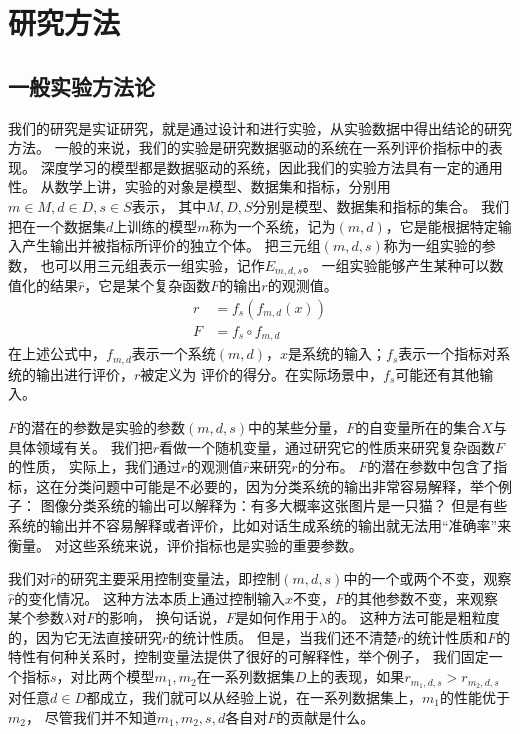 
\chapter{研究方法}\label{ch:研究方法}

\section{一般实验方法论}\label{sec:研究方法论}
我们的研究是实证研究，就是通过设计和进行实验，从实验数据中得出结论的研究方法。
一般的来说，我们的实验是研究数据驱动的系统在一系列评价指标中的表现。
深度学习的模型都是数据驱动的系统，因此我们的实验方法具有一定的通用性。
从数学上讲，实验的对象是模型、数据集和指标，分别用$m\in M, d\in D, s\in S$表示，
其中$M, D, S$分别是模型、数据集和指标的集合。
我们把在一个数据集$d$上训练的模型$m$称为一个系统，记为$(m, d)$，它是能根据特定输入产生输出并被指标所评价的独立个体。
把三元组$(m, d, s)$称为一组实验的参数， 也可以用三元组表示一组实验，记作$E_{m, d, s}$。
一组实验能够产生某种可以数值化的结果$\hat{r}$，它是某个复杂函数$\mathit{F}$的输出$r$的观测值。
\begin{align}
    r &= f_s\left( f_{m, d}(x) \right) \\
    \mathit{F} &= f_s \circ f_{m, d}
\end{align}
在上述公式中，$f_{m, d}$表示一个系统$(m, d)$，$x$是系统的输入；$f_s$表示一个指标对系统的输出进行评价，$r$被定义为
评价的得分。在实际场景中，$f_s$可能还有其他输入。

$\mathit{F}$的潜在的参数是实验的参数$(m, d, s)$中的某些分量，$\mathit{F}$的自变量所在的集合$X$与具体领域有关。
我们把$r$看做一个随机变量，通过研究它的性质来研究复杂函数$\mathit{F}$的性质，
实际上，我们通过$r$的观测值$\hat{r}$来研究$r$的分布。
$\mathit{F}$的潜在参数中包含了指标，这在分类问题中可能是不必要的，因为分类系统的输出非常容易解释，举个例子：
图像分类系统的输出可以解释为：有多大概率这张图片是一只猫？
但是有些系统的输出并不容易解释或者评价，比如对话生成系统的输出就无法用“准确率”来衡量。
对这些系统来说，评价指标也是实验的重要参数。

我们对$\hat{r}$的研究主要采用控制变量法，即控制$(m, d, s)$中的一个或两个不变，观察$\hat{r}$的变化情况。
这种方法本质上通过控制输入$x$不变，$\mathit{F}$的其他参数不变，来观察某个参数$\lambda$对$\mathit{F}$的影响，
换句话说，$\mathit{F}$是如何作用于$\lambda$的。
这种方法可能是粗粒度的，因为它无法直接研究$r$的统计性质。
但是，当我们还不清楚$r$的统计性质和$\mathit{F}$的特性有何种关系时，控制变量法提供了很好的可解释性，举个例子，
我们固定一个指标$s$，对比两个模型$m_1, m_2$在一系列数据集$D$上的表现，如果$r_{m_1, d, s} > r_{m_2, d, s}$
对任意$d\in D$都成立，我们就可以从经验上说，在一系列数据集上，$m_1$的性能优于$m_2$，
尽管我们并不知道$m_1, m_2, s, d$各自对$\mathit{F}$的贡献是什么。

